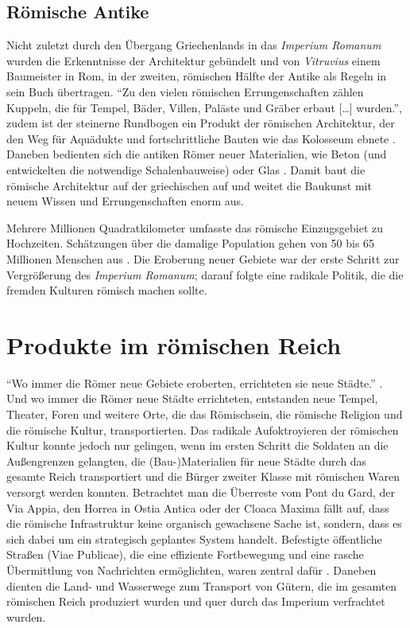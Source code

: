 \documentclass[
    a4paper,
    11pt,
    bibliography=totoc,
    listof=totoc,
    parskip=half,
    headings=normal
]{scrbook}
\begin{document}
\section{Römische Antike}
Nicht zuletzt durch den Übergang Griechenlands in das \textit{Imperium Romanum} wurden die Erkenntnisse der Architektur gebündelt und von \textit{Vitruvius} einem Baumeister in Rom, in der zweiten, römischen Hälfte der Antike als Regeln in sein Buch übertragen. \enquote{Zu den vielen römischen Errungenschaften zählen Kuppeln, die für Tempel, Bäder, Villen, Paläste und Gräber erbaut [\dots] wurden.}, zudem ist der steinerne Rundbogen ein Produkt der römischen Architektur, der den Weg für Aquädukte und fortschrittliche Bauten wie das Kolosseum ebnete \autocite[16]{hodgeKurzeGeschichteArchitektur2022}. Daneben bedienten sich die antiken Römer neuer Materialien, wie Beton (und entwickelten die notwendige Schalenbauweise) oder Glas \autocites[16,208]{hodgeKurzeGeschichteArchitektur2022}[28]{zukowskyGeschichteArchitekturPyramide2022}. Damit baut die römische Architektur auf der griechischen auf und weitet die Baukunst mit neuem Wissen und Errungenschaften enorm aus.

Mehrere Millionen Quadratkilometer umfasste das römische Einzugsgebiet zu Hochzeiten. Schätzungen über die damalige Population gehen von 50 bis 65 Millionen Menschen aus \autocite[813--814]{frierDemography1998}. Die Eroberung neuer Gebiete war der erste Schritt zur Vergrößerung des \textit{Imperium Romanum}; darauf folgte eine radikale Politik, die die fremden Kulturen römisch machen sollte.

\chapter{Produkte im römischen Reich}
\enquote{Wo immer die Römer neue Gebiete eroberten, errichteten sie neue Städte.} \autocite{hodgeKurzeGeschichteArchitektur2022}. Und wo immer die Römer neue Städte errichteten, entstanden neue Tempel, Theater, Foren und weitere Orte, die das Römischsein, die römische Religion und die römische Kultur, transportierten. Das radikale Aufoktroyieren der römischen Kultur konnte jedoch nur gelingen, wenn im ersten Schritt die Soldaten an die Außengrenzen gelangten, die (Bau-)Materialien für neue Städte durch das gesamte Reich transportiert und die Bürger zweiter Klasse mit römischen Waren versorgt werden konnten. Betrachtet man die Überreste vom Pont du Gard, der Via Appia, den Horrea in Ostia Antica oder der Cloaca Maxima fällt auf, dass die römische Infrastruktur keine organisch gewachsene Sache ist, sondern, dass es sich dabei um ein strategisch geplantes System handelt. Befestigte öffentliche Straßen (Viae Publicae), die eine effiziente Fortbewegung und eine rasche Übermittlung von Nachrichten ermöglichten, waren zentral dafür \autocite{thieleAlleWegeFuehren2010}. Daneben dienten die Land- und Wasserwege zum Transport von Gütern, die im gesamten römischen Reich produziert wurden und quer durch das Imperium verfrachtet wurden.
\end{document}

